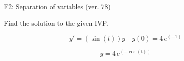 \begin{exercise}
  \begin{exerciseTitle}F2: Separation of variables (ver. 78)\end{exerciseTitle}
  \begin{exerciseStatement}
    
Find the solution to the given IVP.

    
\[y'=( \sin\left(t\right) )y\hspace{1em} y(0)= 4 \, e^{\left(-1\right)}\]

  \end{exerciseStatement}
  \begin{exerciseAnswer}
    
\[y= 4 \, e^{\left(-\cos\left(t\right)\right)}\]

  \end{exerciseAnswer}
\end{exercise}